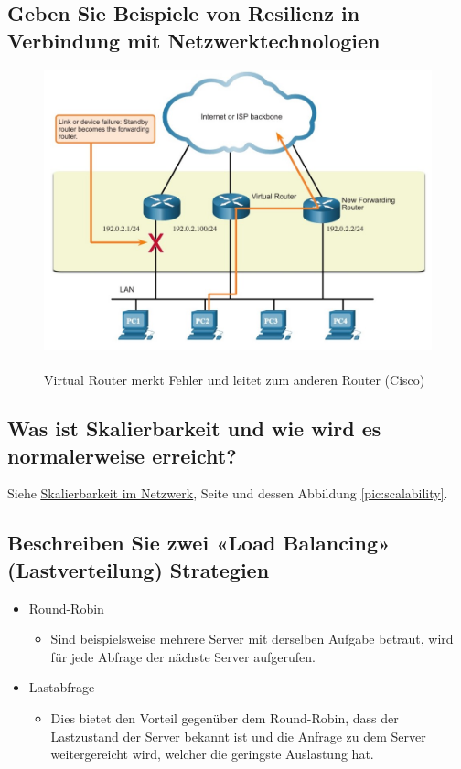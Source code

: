 \subsection*{Geben Sie Beispiele von Resilienz in Verbindung mit Netzwerktechnologien}
\begin{figure}[H]
    \begin{center}
    \label{pic:VirtualRouter}
    \includegraphics[width=\textwidth]{images/virtual_router.jpg}
    \caption{Virtual Router merkt Fehler und leitet zum anderen Router (\textsuperscript{\textcopyright}Cisco)}
    \end{center}
\end{figure}

\subsection*{Was ist Skalierbarkeit und wie wird es normalerweise erreicht?}
Siehe \underline{\hyperref[sub:NetworkScalability]{Skalierbarkeit im Netzwerk}}, Seite \pageref{sub:NetworkScalability} und dessen Abbildung \ref{pic:scalability}.

\subsection*{Beschreiben Sie zwei «Load Balancing» (Lastverteilung) Strategien}
\begin{itemize}
    \item Round-Robin
    \begin{itemize}
        \item Sind beispielsweise mehrere Server mit derselben Aufgabe betraut, wird für jede Abfrage der nächste Server aufgerufen.
    \end{itemize}
    \item Lastabfrage
    \begin{itemize}
        \item Dies bietet den Vorteil gegenüber dem Round-Robin, dass der Lastzustand der Server bekannt ist und die Anfrage zu dem Server weitergereicht wird, welcher die geringste Auslastung hat.
    \end{itemize}
\end{itemize}

